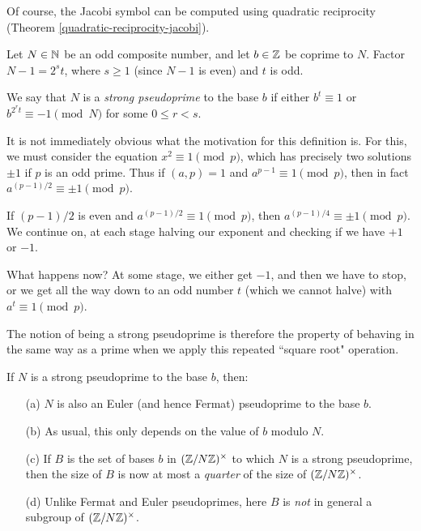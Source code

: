 \documentclass{article}
\begin{document}
Of course, the Jacobi symbol can be computed using quadratic reciprocity (Theorem \ref{quadratic-reciprocity-jacobi}).

\begin{definition}
    Let $N \in \mathbb{N}$ be an odd composite number, and let $b \in \mathbb{Z}$ be coprime to $N$. Factor $N-1 = 2^st$, where $s \geq 1$ (since $N-1$ is even) and $t$ is odd.
    
    We say that $N$ is a \textit{strong pseudoprime} to the base $b$ if either $b^t \equiv 1$ or $b^{2^rt} \equiv -1 \pmod N $ for some $0 \leq r < s$.
\end{definition}

It is not immediately obvious what the motivation for this definition is. For this, we must consider the equation $x^2 \equiv 1 \pmod p$, which has precisely two solutions $\pm 1$ if $p$ is an odd prime. Thus if $(a, p) = 1$ and $a^{p-1} \equiv 1 \pmod p$, then in fact $a^{(p-1)/2} \equiv \pm 1 \pmod p$.

If $(p-1)/2$ is even and $a^{(p-1)/2} \equiv 1 \pmod p$, then $a^{(p-1)/4} \equiv \pm 1 \pmod p$. We continue on, at each stage halving our exponent and checking if we have $+1$ or $-1$.

What happens now? At some stage, we either get $-1$, and then we have to stop, or we get all the way down to an odd number $t$ (which we cannot halve) with $a^t \equiv 1 \pmod p$.

The notion of being a strong pseudoprime is therefore the property of behaving in the same way as a prime when we apply this repeated ``square root" operation.

\begin{proposition}
    If $N$ is a strong pseudoprime to the base $b$, then:
    \begin{enumerate}
	    \item[(a)] $N$ is also an Euler (and hence Fermat) pseudoprime to the base $b$.
	    \item[(b)] As usual, this only depends on the value of $b$ modulo $N$.
	    \item[(c)] If $B$ is the set of bases $b$ in $(\mathbb{Z}/N\mathbb{Z})^\times$ to which $N$ is a strong pseudoprime, then the size of $B$ is now at most a \textit{quarter} of the size of $(\mathbb{Z}/N\mathbb{Z})^\times$.
	    \item[(d)] Unlike Fermat and Euler pseudoprimes, here $B$ is \textit{not} in general a subgroup  of $(\mathbb{Z}/N\mathbb{Z})^\times$.
	\end{enumerate}
\end{proposition}
\end{document}
